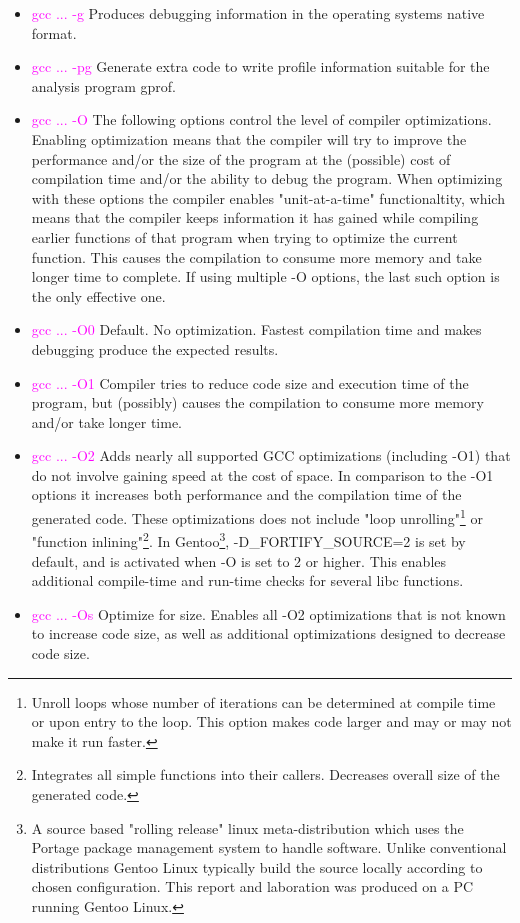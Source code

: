 \documentclass[a4paper,10pt]{article}
\begin{document}
\begin{itemize}
\item \textcolor{magenta}{gcc ... -g} Produces debugging information in the operating systems native format.

\item \textcolor{magenta}{gcc ... -pg} Generate extra code to write profile information suitable for the analysis program gprof.

\item \textcolor{magenta}{gcc ... -O} The following options control the level of compiler optimizations. Enabling optimization means that the compiler will try to improve the performance and/or the size of the program at the (possible) cost of compilation time and/or the ability to debug the program. When optimizing with these options the compiler enables "unit-at-a-time" functionaltity, which means that the compiler keeps information it has gained while compiling earlier functions of that program when trying to optimize the current function. This causes the compilation to consume more memory and take longer time to complete. If using multiple -O options, the last such option is the only effective one.

\item \textcolor{magenta}{gcc ... -O0} Default. No optimization. Fastest compilation time and makes debugging produce the expected results.

\item \textcolor{magenta}{gcc ... -O1} Compiler tries to reduce code size and execution time of the program, but (possibly) causes the compilation to consume more memory and/or take longer time.

\item \textcolor{magenta}{gcc ... -O2} Adds nearly all supported GCC optimizations (including -O1) that do not involve gaining speed at the cost of space. In comparison to the -O1 options it increases both performance and the compilation time of the generated code. These optimizations does not include "loop unrolling"\footnote{Unroll loops whose number of iterations can be determined at compile time or upon entry to the loop. This option makes code larger and may or may not make it run faster.} or "function inlining"\footnote{Integrates all simple functions into their callers. Decreases overall size of the generated code.}. In Gentoo\footnote{A source based "rolling release" linux meta-distribution which uses the Portage package management system to handle software. Unlike conventional distributions Gentoo Linux typically build the source locally according to chosen configuration. This report and laboration was produced on a PC running Gentoo Linux.}, -D\_FORTIFY\_SOURCE=2 is set by default, and is activated when -O is set to 2 or higher. This enables additional compile-time and run-time checks for several libc functions.

\item \textcolor{magenta}{gcc ... -Os} Optimize for size. Enables all -O2 optimizations that is not known to increase code size, as well as additional optimizations designed to decrease code size.

\end{itemize}
\end{document}
